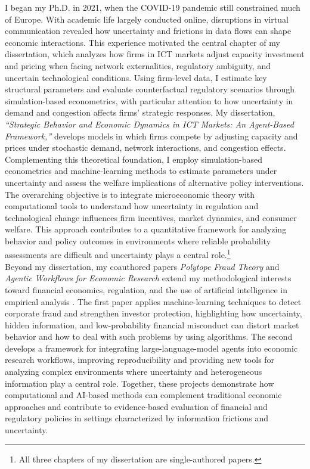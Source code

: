 \documentclass{nfr}
\begin{document}
I began my Ph.D. in 2021, when the COVID-19 pandemic still constrained much of Europe. 
With academic life largely conducted online, disruptions in virtual communication revealed how uncertainty and frictions in data flows can shape economic interactions. 
This experience motivated the central chapter of my dissertation, which analyzes how firms in ICT markets adjust capacity investment and pricing when facing network externalities, regulatory ambiguity, and uncertain technological conditions. 
Using firm-level data, I estimate key structural parameters and evaluate counterfactual regulatory scenarios through simulation-based econometrics, with particular attention to how uncertainty in demand and congestion affects firms’ strategic responses.
My dissertation, \textit{“Strategic Behavior and Economic Dynamics in ICT Markets: An Agent-Based Framework,”} develops models in which firms compete by adjusting capacity and prices under stochastic demand, network interactions, and congestion effects. 
Complementing this theoretical foundation, I employ simulation-based econometrics and machine-learning methods to estimate parameters under uncertainty and assess the welfare implications of alternative policy interventions. 
The overarching objective is to integrate microeconomic theory with computational tools to understand how uncertainty in regulation and technological change influences firm incentives, market dynamics, and consumer welfare. 
This approach contributes to a quantitative framework for analyzing behavior and policy outcomes in environments where reliable probability assessments are difficult and uncertainty plays a central role.\footnote{All three chapters of my dissertation are single-authored papers.}\\

Beyond my dissertation, my coauthored papers \textit{Polytope Fraud Theory} and \textit{Agentic Workflows for Economic Research} extend my methodological interests toward financial economics, regulation, and the use of artificial intelligence in empirical analysis \citep{Zhao2025, Dawid2025}. 
The first paper applies machine-learning techniques to detect corporate fraud and strengthen investor protection, highlighting how uncertainty, hidden information, and low-probability financial misconduct can distort market behavior and how to deal with such problems by using algorithms. 
The second develops a framework for integrating large-language-model agents into economic research workflows, improving reproducibility and providing new tools for analyzing complex environments where uncertainty and heterogeneous information play a central role. 
Together, these projects demonstrate how computational and AI-based methods can complement traditional economic approaches and contribute to evidence-based evaluation of financial and regulatory policies in settings characterized by information frictions and uncertainty.\\
\end{document}
